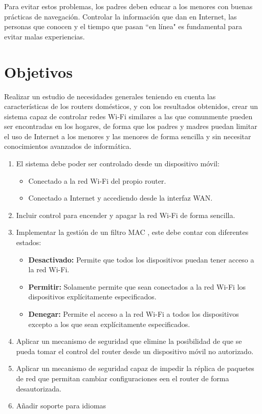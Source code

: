 \documentclass[12pt]{article}
\begin{document}
Para evitar estos problemas, los padres deben educar a los menores con buenas prácticas de navegación. Controlar la información que dan en Internet, las personas que conocen y el tiempo que pasan ``en línea" es fundamental para evitar malas experiencias. 

\section{Objetivos}
    Realizar un estudio de necesidades generales teniendo en cuenta las características de los routers domésticos, y con los resultados obtenidos, crear un sistema capaz de controlar redes Wi-Fi similares a las que comunmente pueden ser encontradas en los hogares, de forma que los padres y madres puedan limitar el uso de Internet a los menores y las menores de forma sencilla y sin necesitar conocimientos avanzados de informática.

    \begin{enumerate}
        \item El sistema debe poder ser controlado desde un dispositivo móvil:
        \begin{itemize}
            \item Conectado a la red Wi-Fi del propio router.
            \item Conectado a Internet y accediendo desde la interfaz WAN.
        \end{itemize}

        \item Incluir control para encender y apagar la red Wi-Fi de forma sencilla.
        \item Implementar la gestión de un filtro MAC , este debe contar con diferentes estados:
            \begin{itemize}
                \item \textbf{Desactivado:} Permite que todos los dispositivos puedan tener acceso a la red Wi-Fi.
                \item \textbf{Permitir:} Solamente permite que sean conectados a la red Wi-Fi los dispositivos explícitamente especificados. 
                \item \textbf{Denegar:} Permite el acceso a la red Wi-Fi a todos los dispositivos excepto a los que sean explícitamente especificados.
            \end{itemize}
        \item Aplicar un mecanismo de seguridad que elimine la posibilidad de que se pueda tomar el control del router desde un dispositivo móvil no autorizado.
        \item Aplicar un mecanismo de seguridad capaz de impedir la réplica de paquetes de red que permitan cambiar configuraciones een el router de forma desautorizada.
        \item Añadir soporte para idiomas
    \end{enumerate}
\end{document}
